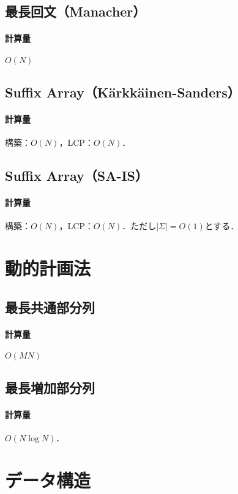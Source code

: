 \documentclass[landscape,twocolumn,9pt]{jsarticle}
\begin{document}
\subsection{最長回文（Manacher）}
\paragraph{計算量} $O(N)$


\subsection{Suffix Array（K\"arkk\"ainen-Sanders）}
\paragraph{計算量} 構築：$O(N)$，LCP：$O(N)$．


\subsection{Suffix Array（SA-IS）}
\paragraph{計算量} 構築：$O(N)$，LCP：$O(N)$．ただし$|\Sigma|=O(1)$とする．


\section{動的計画法}%
\subsection{最長共通部分列}
\paragraph{計算量} $O(MN)$


\subsection{最長増加部分列}
\paragraph{計算量} $O(N\log N)$．


\section{データ構造}%
\end{document}
